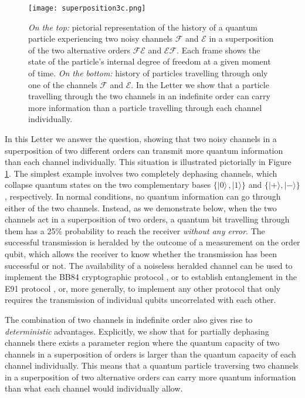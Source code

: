 \documentclass[aps,prl,twocolumn,superscriptaddress,groupedaddress]{revtex4}
\def\>{\rangle}
\newcommand{\map}[1]{\mathcal{#1}}
\begin{document}
 
\begin{figure}
  \centering%
      \texttt{[image: superposition3c.png]}
  \caption{
  {\em On the top:} pictorial representation of the history of a quantum particle experiencing two noisy channels $\map F$ and $\map E$ in a superposition of the two alternative orders  $\map F \map E$ and $\map E \map F$. 
  Each frame shows the state of the  particle's internal degree of freedom at a given moment of time. 
      {\em On the bottom:}  history of particles travelling through only one of the channels $\map F$ and $\map E$.  In the Letter we show that a particle travelling through the two channels in an indefinite order can carry more information than a particle travelling through each channel individually. 
  }
    \label{diag}
\end{figure}
   
    
In this Letter we answer the question,  showing that two  noisy channels  in a superposition of two different orders can   transmit more quantum information than each channel  individually. This situation is illustrated pictorially in Figure \ref{diag}.  The simplest example involves  two  completely dephasing channels, which collapse quantum states on the two  complementary bases  $\{|0\> \, ,  |1\>\}$ and $\{|+\> , |-\>\}$, respectively. In normal conditions, no quantum information can go through either of the two channels.    Instead, as we demonstrate below, when the two channels act in a superposition of two orders, a quantum bit travelling through them has a 25\% probability to  reach the receiver {\em without any error}.  The successful transmission is heralded by the outcome of a measurement on the order qubit,  which allows the receiver to know whether the transmission has been successful or not.    
 The availability of a noiseless heralded channel can be used to implement the BB84 cryptographic protocol \cite{BennettCh1984}, or to establish entanglement in the E91 protocol \cite{ekert1991quantum}, or, more generally, to implement  any other protocol that only requires the transmission of individual qubits  uncorrelated with each other.    
 
 The combination of two channels in indefinite order also gives rise to {\em deterministic} advantages. Explicitly, we show that for partially dephasing channels there exists a parameter region where the quantum capacity of two channels in a superposition of orders is larger than the quantum capacity of each channel individually. This means that a quantum particle traversing  two channels in a superposition of two alternative orders can carry more quantum information than  %
 what each channel would  individually allow. 
 
\end{document}
